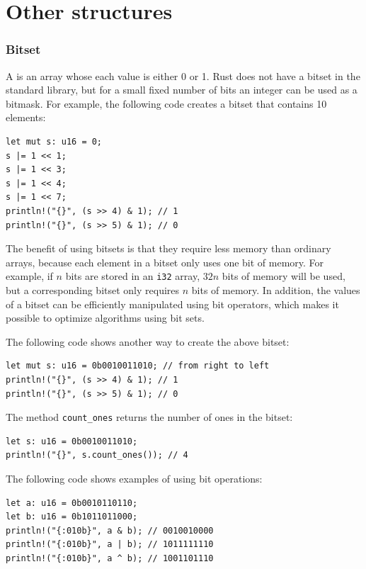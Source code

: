 \section{Other structures}

\subsubsection{Bitset}


A  is an array
whose each value is either 0 or 1.
Rust does not have a bitset in the standard library,
but for a small fixed number of bits an integer
can be used as a bitmask.
For example, the following code creates
a bitset that contains 10 elements:

\begin{lstlisting}
let mut s: u16 = 0;
s |= 1 << 1;
s |= 1 << 3;
s |= 1 << 4;
s |= 1 << 7;
println!("{}", (s >> 4) & 1); // 1
println!("{}", (s >> 5) & 1); // 0
\end{lstlisting}

The benefit of using bitsets is that
they require less memory than ordinary arrays,
because each element in a bitset only
uses one bit of memory.
For example,
if $n$ bits are stored in an \texttt{i32} array,
$32n$ bits of memory will be used,
but a corresponding bitset only requires $n$ bits of memory.
In addition, the values of a bitset
can be efficiently manipulated using
bit operators, which makes it possible to
optimize algorithms using bit sets.

The following code shows another way to create the above bitset:
\begin{lstlisting}
let mut s: u16 = 0b0010011010; // from right to left
println!("{}", (s >> 4) & 1); // 1
println!("{}", (s >> 5) & 1); // 0
\end{lstlisting}

The method \texttt{count\_ones} returns the number
of ones in the bitset:

\begin{lstlisting}
let s: u16 = 0b0010011010;
println!("{}", s.count_ones()); // 4
\end{lstlisting}

The following code shows examples of using bit operations:
\begin{lstlisting}
let a: u16 = 0b0010110110;
let b: u16 = 0b1011011000;
println!("{:010b}", a & b); // 0010010000
println!("{:010b}", a | b); // 1011111110
println!("{:010b}", a ^ b); // 1001101110
\end{lstlisting}


